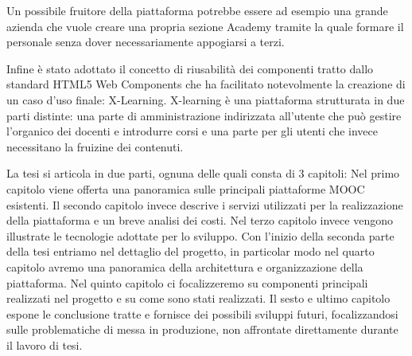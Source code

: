 Un possibile fruitore della piattaforma potrebbe essere ad esempio una grande azienda che vuole creare una propria sezione Academy tramite la quale formare il personale senza dover necessariamente appogiarsi a terzi. 

Infine è stato adottato il concetto di riusabilità dei componenti tratto dallo standard HTML5 Web Components che ha facilitato notevolmente la creazione di un caso d'uso finale: X-Learning.
X-learning è una piattaforma strutturata in due parti distinte: una parte di amministrazione indirizzata all'utente che può gestire l'organico dei docenti e introdurre corsi e una parte per gli utenti che invece necessitano la fruizine dei contenuti.

La tesi si articola in due parti, ognuna delle quali consta di 3 capitoli:
Nel primo capitolo viene offerta una panoramica sulle principali piattaforme MOOC esistenti.
Il secondo capitolo invece descrive i servizi utilizzati per la realizzazione della piattaforma e un breve analisi dei costi.
Nel terzo capitolo invece vengono illustrate le tecnologie adottate per lo sviluppo.
Con l'inizio della seconda parte della tesi entriamo nel dettaglio del progetto, in particolar modo nel quarto capitolo avremo una panoramica della architettura e organizzazione della piattaforma.
Nel quinto capitolo ci focalizzeremo su componenti principali realizzati nel progetto e su come sono stati realizzati.
Il sesto e ultimo capitolo espone le conclusione tratte e fornisce dei possibili sviluppi futuri, focalizzandosi sulle problematiche di messa in produzione, non affrontate direttamente durante il lavoro di tesi.